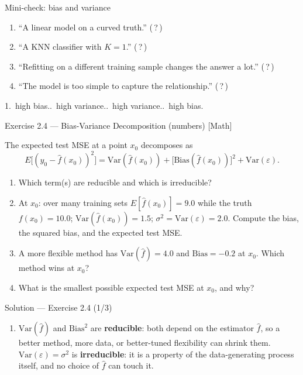 \documentclass[aspectratio=169,11pt]{beamer}
\begin{document}
\begin{frame}{Mini-check: bias and variance}
  \begin{readme}
    \begin{enumerate}
      \item ``A linear model on a curved truth.'' \hfill (\,?\,)
      \item ``A KNN classifier with $K = 1$.''      \hfill (\,?\,)
      \item ``Refitting on a different training sample changes the
            answer a lot.'' \hfill (\,?\,)
      \item ``The model is too simple to capture the relationship.''
            \hfill (\,?\,)
    \end{enumerate}
  \end{readme}
  \begin{takeaway}[Answers]
    1.\ high bias..\ high variance..\ high variance..\ high bias.
  \end{takeaway}
\end{frame}

\begin{frame}{Exercise 2.4 --- Bias-Variance Decomposition (numbers) [Math]}
\begin{exercise}
The expected test MSE at a point $x_0$ decomposes as
\[
  E\bigl[(y_0-\hat f(x_0))^2\bigr]
   = \mathrm{Var}(\hat f(x_0)) + \bigl[\mathrm{Bias}(\hat f(x_0))\bigr]^2
   + \mathrm{Var}(\varepsilon).
\]
\begin{enumerate}
  \item Which term(s) are reducible and which is irreducible?
  \item At $x_0$: over many training sets $E[\hat f(x_0)]=9.0$ while
        the truth $f(x_0)=10.0$; $\mathrm{Var}(\hat f(x_0))=1.5$;
        $\sigma^2=\mathrm{Var}(\varepsilon)=2.0$. Compute the bias,
        the squared bias, and the expected test MSE.
  \item A more flexible method has $\mathrm{Var}(\hat f)=4.0$ and
        $\mathrm{Bias}=-0.2$ at $x_0$. Which method wins at $x_0$?
  \item What is the smallest possible expected test MSE at $x_0$, and
        why?
\end{enumerate}
\end{exercise}
\end{frame}

\begin{frame}{Solution --- Exercise 2.4 (1/3)}
\begin{solutionbox}
\begin{enumerate}
  \item $\mathrm{Var}(\hat f)$ and $\mathrm{Bias}^2$ are
        \textbf{reducible}: both depend on the estimator $\hat f$, so
        a better method, more data, or better-tuned flexibility can
        shrink them. $\mathrm{Var}(\varepsilon)=\sigma^2$ is
        \textbf{irreducible}: it is a property of the data-generating
        process itself, and no choice of $\hat f$ can touch it.
  \end{enumerate}
\end{solutionbox}
\end{frame}
\end{document}

